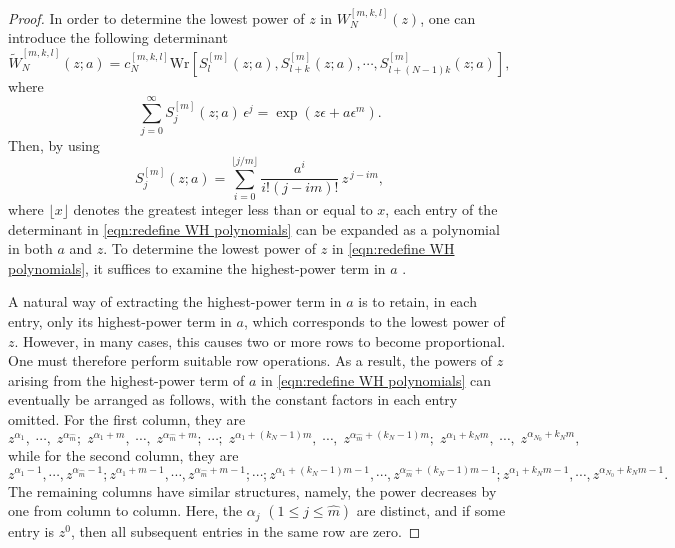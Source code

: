 \documentclass[preprint,3p,10pt]{elsarticle}
\theoremstyle{definition}
\begin{document}
\begin{proof}
In order to determine the lowest power of $z$ in $W_N^{[m,k,l]}(z)$, one can introduce the following determinant \cite{yang2023rogue,zhang2022rogue,lin2024rogue}
\begin{equation}\label{eqn:redefine WH polynomials}
\widetilde{W}_{N}^{[m,k,l]}(z;a)
=
c_{N}^{[m,k,l]} \mathrm{Wr}\left[S_{l}^{[m]}(z;a),S_{l+k}^{[m]}(z;a), \cdots, S_{l+(N-1)k}^{[m]}(z;a)\right],
\end{equation}
where 
\begin{equation}
\sum_{j=0}^{\infty} S_j^{[m]}(z;a)\,\epsilon^j
=
\exp\!\left(z\epsilon+a\epsilon^m\right).
\end{equation}
Then, by using
\begin{equation}\label{eqn:expansion of S_j(a,z)}
S_{j}^{[m]}(z;a)
=
\sum_{i=0}^{\lfloor j/m \rfloor}
\frac{a^{i}}{i!(j-im)!}\,
z^{\,j-im},
\end{equation}
where \(\lfloor x \rfloor\) denotes the greatest integer less than or equal to \(x\), each entry of the determinant in \eqref{eqn:redefine WH polynomials} can be expanded as a polynomial in both \(a\) and \(z\). To determine the lowest power of \(z\) in \eqref{eqn:redefine WH polynomials}, it suffices to examine the highest-power term in \(a\) \cite{lin2024rogue}. 

A natural way of extracting the highest-power term in \(a\) is to retain, in each entry, only its highest-power term in \(a\), which corresponds to the lowest power of \(z\). However, in many cases, this causes two or more rows to become proportional.
One must therefore perform suitable row operations. As a result, the powers of \(z\) arising from the highest-power term of \(a\) in \eqref{eqn:redefine WH polynomials} can eventually be arranged as follows, with the constant factors in each entry omitted. For the first column, they are
{\footnotesize
\begin{equation}\label{eqn:power of z after row operation}
z^{\alpha_1},
\; \cdots, \;
z^{\alpha_{\hat m}};
\;
z^{\alpha_1+m},
\; \cdots, \;
z^{\alpha_{\hat m}+m};
\; \cdots; \;
z^{\alpha_1+(k_N-1)m},
\; \cdots, \;
z^{\alpha_{\hat m}+(k_N-1)m};
\;
z^{\alpha_1+k_N m},
\; \cdots, \;
z^{\alpha_{N_0}+k_N m},
\end{equation}}
while for the second column, they are
{\scriptsize\begin{equation}
z^{\alpha_1-1},\cdots,
z^{\alpha_{\hat m}-1};
z^{\alpha_1+m-1},
\cdots,
z^{\alpha_{\hat m}+m-1};
\cdots;
z^{\alpha_1+(k_N-1)m-1},
\cdots,
z^{\alpha_{\hat m}+(k_N-1)m-1};
z^{\alpha_1+k_N m-1},\cdots,
z^{\alpha_{N_0}+k_N m-1}.
\end{equation}}
The remaining columns have similar structures, namely, the power decreases by one from column to column. Here, the \(\alpha_j\) \((1\le j\le \hat m)\) are distinct, and if some entry is \(z^0\), then all subsequent entries in the same row are zero. 





\end{proof}
\end{document}
